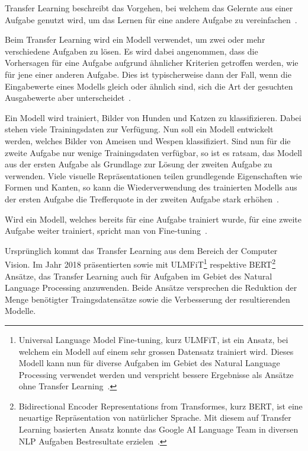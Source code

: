 Transfer Learning beschreibt das Vorgehen, bei welchem das Gelernte aus einer Aufgabe genutzt wird, um das Lernen für eine andere Aufgabe zu vereinfachen~\autocite{Goodfellow2016}.

Beim Transfer Learning wird ein Modell verwendet, um zwei oder mehr verschiedene Aufgaben zu lösen. Es wird dabei angenommen, dass die Vorhersagen für eine Aufgabe aufgrund ähnlicher Kriterien getroffen werden, wie für jene einer anderen Aufgabe. Dies ist typischerweise dann der Fall, wenn die Eingabewerte eines Modells gleich oder ähnlich sind, sich die Art der gesuchten Ausgabewerte aber unterscheidet~\autocite{Goodfellow2016}.

Ein Modell wird trainiert, Bilder von Hunden und Katzen zu klassifizieren. Dabei stehen viele Trainingsdaten zur Verfügung. Nun soll ein Modell entwickelt werden, welches Bilder von Ameisen und Wespen klassifiziert. Sind nun für die zweite Aufgabe nur wenige Trainingsdaten verfügbar, so ist es ratsam, das Modell aus der ersten Aufgabe als Grundlage zur Lösung der zweiten Aufgabe zu verwenden. Viele visuelle Repräsentationen teilen grundlegende Eigenschaften wie Formen und Kanten, so kann die Wiederverwendung des trainierten Modells aus der ersten Aufgabe die Trefferquote in der zweiten Aufgabe stark erhöhen~\autocite{Goodfellow2016}.

Wird ein Modell, welches bereits für eine Aufgabe trainiert wurde, für eine zweite Aufgabe weiter trainiert, spricht man von Fine-tuning~\autocite{Goodfellow2016}.

Ursprünglich kommt das Transfer Learning aus dem Bereich der Computer Vision. Im Jahr 2018 präsentierten \textcite{Howard2018} sowie \textcite{Devlin2018} mit ULMFiT\footnote{Universal Language Model Fine-tuning, kurz ULMFiT, ist ein Ansatz, bei welchem ein Modell auf einem sehr grossen Datensatz trainiert wird. Dieses Modell kann nun für diverse Aufgaben im Gebiet des Natural Language Processing verwendet werden und verspricht bessere Ergebnisse als Ansätze ohne Transfer Learning~\autocite{Howard2018}.} respektive BERT\footnote{Bidirectional Encoder Representations from Transformes, kurz BERT, ist eine neuartige Repräsentation von natürlicher Sprache. Mit diesem auf Transfer Learning basierten Ansatz konnte das Google AI Language Team in diversen NLP Aufgaben Bestresultate erzielen~\autocite{Devlin2018}.} Ansätze, das Transfer Learning auch für Aufgaben im Gebiet des Natural Language Processing anzuwenden. Beide Ansätze versprechen die Reduktion der Menge benötigter Traingsdatensätze sowie die Verbesserung der resultierenden Modelle.

